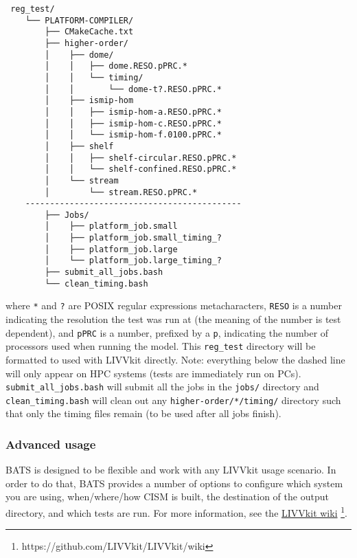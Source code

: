 \begin{verbatim}
 reg_test/
    └── PLATFORM-COMPILER/
        ├── CMakeCache.txt
        ├── higher-order/
        │    ├── dome/
        │    │   ├── dome.RESO.pPRC.*
        │    │   └── timing/
        │    │       └── dome-t?.RESO.pPRC.*
        │    ├── ismip-hom
        │    │   ├── ismip-hom-a.RESO.pPRC.*
        │    │   ├── ismip-hom-c.RESO.pPRC.*
        │    │   └── ismip-hom-f.0100.pPRC.*
        │    ├── shelf
        │    │   ├── shelf-circular.RESO.pPRC.*
        │    │   └── shelf-confined.RESO.pPRC.*
        │    └── stream
        │        └── stream.RESO.pPRC.*
    --------------------------------------------
        ├── Jobs/
        │    ├── platform_job.small
        │    ├── platform_job.small_timing_?
        │    ├── platform_job.large
        │    └── platform_job.large_timing_?
        ├── submit_all_jobs.bash
        └── clean_timing.bash
\end{verbatim}

\noindent
where \texttt{*} and \texttt{?} are POSIX regular expressions metacharacters, \texttt{RESO} is a number indicating the
resolution the test was run at (the meaning of the number is test dependent), and \texttt{pPRC} is a number, prefixed by
a \texttt{p}, indicating the number of processors used when running the model. This \texttt{reg\_test} directory will be
formatted to used with LIVVkit directly. Note: everything below the dashed line will only appear on HPC systems (tests
are immediately run on PCs).  \texttt{submit\_all\_jobs.bash} will submit all the jobs in the \texttt{jobs/} directory
and \texttt{clean\_timing.bash} will clean out any \texttt{higher-order/*/timing/} directory such that only the timing
files remain (to be used after all jobs finish).

\subsubsection{Advanced usage}
    
BATS is designed to be flexible and work with any LIVVkit usage scenario. In order to do that, BATS provides a number of
options to configure which system you are using, when/where/how CISM is built, the destination of the output directory,
and which tests are run. For more information, see the \href{https://github.com/LIVVkit/LIVVkit/wiki}{LIVVkit wiki}
\footnote{https://github.com/LIVVkit/LIVVkit/wiki}. 



